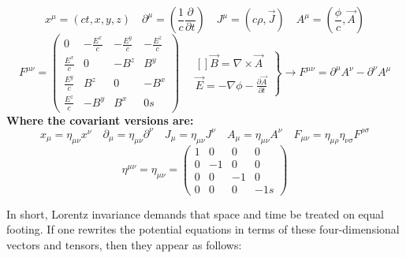 \documentclass[a4]{article}
\begin{document}
    \begin{framed}
        \noindent
        \begin{equation}
            x^{\mu} = (ct, x, y, z) \quad
            \partial^{\mu} = (\frac{1}{c} \frac{\partial}{\partial t}) \quad
            J^{\mu} = (c \rho, \vec{J}) \quad
            A^{\mu} = (\frac{\phi}{c}, \vec{A})
        \end{equation}
        \begin{equation}
            F^{\mu \nu} = 
            \begin{pmatrix}
                0 & -\frac{E^x}{c} & -\frac{E^y}{c} & -\frac{E^z}{c} \\
                \frac{E^x}{c} & 0 & - B^z & B^y \\
                \frac{E^y}{c} & B^z & 0 & - B^x \\
                \frac{E^z}{c} & - B^y & B^x & 0s
            \end{pmatrix} \quad
            \left. \begin{aligned}[]
                \vec{B} = \nabla \times \vec{A} \\
                \vec{E} = - \nabla \phi - \frac{\partial \vec{A}}{\partial t}
            \end{aligned} 
            \right\} \rightarrow F^{\mu \nu} = \partial^{\mu} A^{\nu} - \partial^{\nu} A^{\mu}
        \end{equation}
        \textbf{Where the covariant versions are:}
        \begin{equation}
            x_{\mu} = \eta_{\mu \nu} x^{\nu} \quad
            \partial_{\mu} = \eta_{\mu \nu} \partial^{\nu} \quad
            J_{\mu} = \eta_{\mu \nu} J^{\nu} \quad
            A_{\mu} = \eta_{\mu \nu} A^{\nu} \quad
            F_{\mu \nu} = \eta_{\mu \rho} \eta_{\nu \sigma} F^{\rho \sigma}
        \end{equation}
        \begin{equation}
            \eta^{\mu \nu} = \eta_{\mu \nu} = \begin{pmatrix}
                1 & 0 & 0 & 0 \\
                0 & -1 & 0 & 0 \\
                0 & 0 & -1 & 0 \\
                0 & 0 & 0 & -1 s
            \end{pmatrix}
        \end{equation}
    \end{framed}

    In short, Lorentz invariance demands that space and time be treated on equal footing. If one rewrites the potential equations in terms of these four-dimensional vectors and tensors, then they appear as follows:
\end{document}
